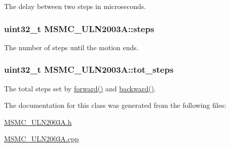 The delay between two steps in microseconds. 

\hypertarget{class_m_s_m_c___u_l_n2003_a_afc5c41c229b3d634bd4aea51dcef7599}{
\subsubsection[{steps}]{\setlength{\rightskip}{0pt plus 5cm}uint32\+\_\+t M\+S\+M\+C\+\_\+\+U\+L\+N2003\+A\+::steps\hspace{0.3cm}{\ttfamily [private]}}}\label{class_m_s_m_c___u_l_n2003_a_afc5c41c229b3d634bd4aea51dcef7599}


The number of steps until the motion ends. 

\hypertarget{class_m_s_m_c___u_l_n2003_a_a8e1a83575d5ad2d15a8a81eccf1bdba6}{
\subsubsection[{tot\+\_\+steps}]{\setlength{\rightskip}{0pt plus 5cm}uint32\+\_\+t M\+S\+M\+C\+\_\+\+U\+L\+N2003\+A\+::tot\+\_\+steps\hspace{0.3cm}{\ttfamily [private]}}}\label{class_m_s_m_c___u_l_n2003_a_a8e1a83575d5ad2d15a8a81eccf1bdba6}


The total steps set by \hyperlink{class_m_s_m_c___u_l_n2003_a_a9657492f948a75472b311bc0b823899f}{forward()} and \hyperlink{class_m_s_m_c___u_l_n2003_a_ac46e6ec6345f95b534079bcf2920885e}{backward()}. 



The documentation for this class was generated from the following files\+:\begin{DoxyCompactItemize}
\item 
\hyperlink{_m_s_m_c___u_l_n2003_a_8h}{M\+S\+M\+C\+\_\+\+U\+L\+N2003\+A.\+h}\item 
\hyperlink{_m_s_m_c___u_l_n2003_a_8cpp}{M\+S\+M\+C\+\_\+\+U\+L\+N2003\+A.\+cpp}\end{DoxyCompactItemize}
